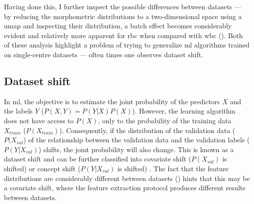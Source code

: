 \begin{figure}[!ht]
    \label{fig:disease-detection-vcq-comparison}
\end{figure}

Having done this, I further inspect the possible differences between datasets --- by reducing the morphometric distributions to a two-dimensional space using a \ac{umap} and inspecting their distribution, a batch effect becomes considerably evident and relatively more apparent for \ac{rbc} when compared with \ac{wbc} (). Both of these analysis highlight a problem of trying to generalize \ac{ml} algorithms trained on single-centre datasets --- often times one observes dataset shift. 

\begin{figure}[!ht]
    \label{fig:u-map}
\end{figure}

\subsection{Dataset shift} 

In \ac{ml}, the objective is to estimate the joint probability of the predictors $X$ and the labels $Y$ ($P(X,Y)=P(Y|X)P(X)$). However, the learning algorithm does not have access to $P(X)$, only to the probability of the training data $X_{train}$ ($P(X_{train})$). Consequently, if the distribution of the validation data ($P(X_{val}$) of the relationship between the validation data and the validation labels ($P(Y|X_{val})$) shifts, the joint probability will also change. This is known as a dataset shift and can be further classified into covariate shift ($P(X_{val})$ is shifted) or concept shift ($P(Y|X_{val})$ is shifted) \cite{Y2019-vc}. The fact that the feature distributions are considerably different between datasets () hints that this may be a covariate shift, where the feature extraction protocol produces different results between datasets.

